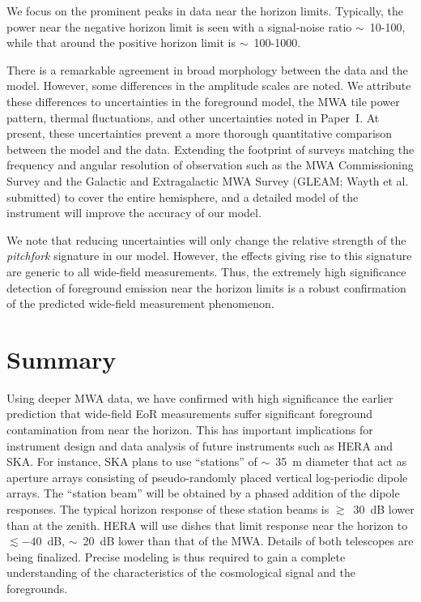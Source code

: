 \documentclass[preprint2,apjl,numberedappendix,twocolappendix,appendixfloats]{emulateapj}
\begin{document}
We focus on the prominent peaks in data near the horizon limits. Typically, the power near the negative horizon limit is seen with a signal-noise ratio $\sim$~10-100, while that around the positive horizon limit is $\sim$~100-1000. 

There is a remarkable agreement in broad morphology between the data and the model. However, some differences in the amplitude scales are noted. We attribute these differences to uncertainties in the foreground model, the MWA tile power pattern, thermal fluctuations, and other uncertainties noted in Paper~I. At present, these uncertainties prevent a more thorough quantitative comparison between the model and the data. Extending the footprint of surveys matching the frequency and angular resolution of observation such as the MWA Commissioning Survey \citep[MWACS;][]{hur14} and the Galactic and Extragalactic MWA Survey (GLEAM; Wayth et al. submitted) to cover the entire hemisphere, and a detailed model of the instrument will improve the accuracy of our model. 

We note that reducing uncertainties will only change the relative strength of the {\it pitchfork} signature in our model. However, the effects giving rise to this signature are generic to all wide-field measurements. Thus, the extremely high significance detection of foreground emission near the horizon limits is a robust confirmation of the predicted wide-field measurement phenomenon.

\section{Summary}\label{sec:summary}

Using deeper MWA data, we have confirmed with high significance the earlier prediction that wide-field EoR measurements suffer significant foreground contamination from near the horizon. This has important implications for instrument design and data analysis of future instruments such as HERA and SKA. For instance, SKA plans to use ``stations'' of $\sim$~35~m diameter that act as aperture arrays consisting of pseudo-randomly placed vertical log-periodic dipole arrays. The ``station beam'' will be obtained by a phased addition of the dipole responses. The typical horizon response of these station beams is $\gtrsim$~30~dB lower than at the zenith. HERA will use dishes that limit response near the horizon to $\lesssim -40$~dB, $\sim$~20~dB lower than that of the MWA. Details of both telescopes are being finalized. Precise modeling is thus required to gain a complete understanding of the characteristics of the cosmological signal and the foregrounds. 
\end{document}
